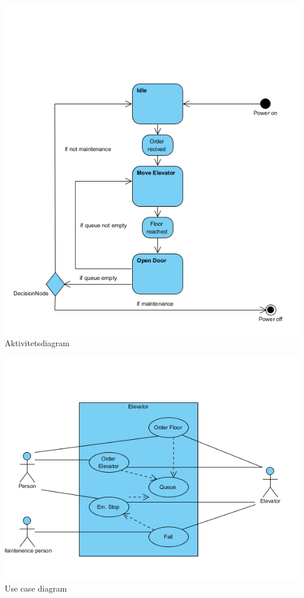 \documentclass[pdftex,12pt,a4paper]{article}
\begin{document}
\begin{center}
\includegraphics[scale=0.71]{./activity_diagram.png}
\\Aktivitetsdiagram
\end{center}

\begin{center}
\includegraphics[scale=0.71]{./use_case_diagram.jpg}
\\Use case diagram
\end{center}
\end{document}
